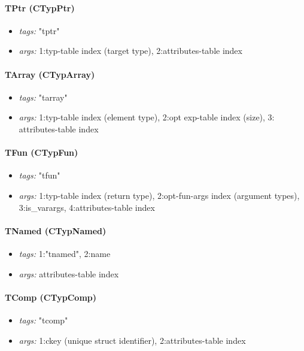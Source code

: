 \documentclass[11pt]{article}
\begin{document}
\paragraph{TPtr (CTypPtr)}
\begin{itemize}
\item \emph{tags:} "tptr"
\item \emph{args:} 1:typ-table index (target type), 2:attributes-table index
\end{itemize}

\paragraph{TArray (CTypArray)}
\begin{itemize}
\item \emph{tags:} "tarray"
\item \emph{args:} 1:typ-table index (element type), 2:opt exp-table index (size), 
   3: attributes-table index
\end{itemize}

\paragraph{TFun (CTypFun)}
\begin{itemize}
\item \emph{tags:} "tfun"
\item \emph{args:} 1:typ-table index (return type), 2:opt-fun-args index (argument types),
         3:is\_varargs, 4:attributes-table index
\end{itemize}

\paragraph{TNamed (CTypNamed)}
\begin{itemize}
\item \emph{tags:} 1:"tnamed", 2:name
\item \emph{args:} attributes-table index
\end{itemize}

\paragraph{TComp (CTypComp)}
\begin{itemize}
\item \emph{tags:} "tcomp"
\item \emph{args:} 1:ckey (unique struct identifier), 2:attributes-table index
\end{itemize}
\end{document}
